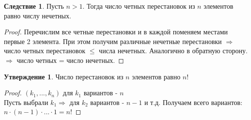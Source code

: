 \documentclass[a4paper, 12pt]{article}
\theoremstyle{definition}
\newtheorem*{consequense}{Следствие}
\newtheorem*{subtheorem}{Утверждение}
\begin{document}
  \begin{consequense}
    Пусть $n>1$. Тогда число четных перестановок из $n$ элементов равно числу нечетных. 
  \end{consequense} 
  \begin{proof}
    Перечислим все четные перестановки и в каждой поменяем местами первые 2 элемента. При этом получим различные нечетные перестановки $\Longrightarrow $ число четных перестановок $\leq$ числа нечетных. Аналогично в обратную сторону. \\
    $\Longrightarrow $ число четных = число нечетных. 
  \end{proof} 
  \begin{subtheorem}
    Число перестановок из $n$ элементов равно $n!$ 
  \end{subtheorem} 
  \begin{proof}
    $(k_1,...,k_n)$ для $k_1$ вариантов - $n$  \\
    Пусть выбрали $k_1 \Longrightarrow$ для  $k_2$ вариантов - $n-1$ и т.д. Получаем всего вариантов: $n\cdot(n-1)\cdot ... \cdot 1 = n! $ 
  \end{proof} 

  \newpage
  
\end{document}
